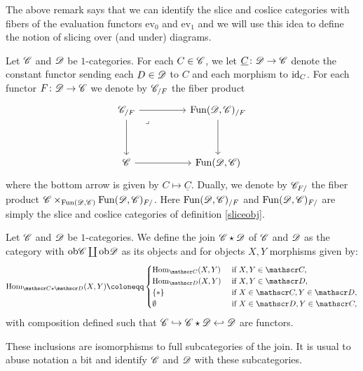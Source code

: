 \documentclass[../../thesis.tex]{subfiles}
\begin{document}
The above remark says that we can identify the slice and coslice categories with fibers of the evaluation functors $\mathrm{ev}_0$ and $\mathrm{ev}_1$ and we will use this idea to define the notion of slicing over (and under) diagrams.
\begin{definition}\label{slicefun}
    Let $\mathscr{C}$ and $\mathscr{D}$ be $1$-categories.
    For each $C\in \mathscr{C}$, we let $\underline{C} \colon \mathscr{D} \to \mathscr{C}$ denote the constant functor sending each $D\in \mathscr{D}$ to $C$ and each morphism to $\operatorname{id}_C$.
    For each functor $F\colon\mathscr{D}\to\mathscr{C}$ we denote by $\mathscr{C}_{/F}$ the fiber product
    \[\begin{tikzcd}
            {\C_{/F}} && {\Fun(\D,\C)_{/F}} \\
            \\
            \C && {\Fun(\D,\C)}
            \arrow[from=1-1, to=1-3]
            \arrow[from=1-1, to=3-1]
            \arrow[from=3-1, to=3-3]
            \arrow[from=1-3, to=3-3]
            \arrow["\lrcorner"{anchor=center, pos=0.125}, draw=none, from=1-1, to=3-3]
        \end{tikzcd}\]
    where the bottom arrow is given by $C \mapsto \underline{C}$.
    Dually, we denote by $\mathscr{C}_{F/}$ the fiber product ${\mathscr{C} \times_{\mathrm{Fun}(\mathscr{D},\mathscr{C})}\mathrm{Fun}(\mathscr{D},\mathscr{C})_{F/}}$.
    Here $\mathrm{Fun}(\mathscr{D},\mathscr{C})_{/F}$ and $\mathrm{Fun}(\mathscr{D},\mathscr{C})_{F/}$ are simply the slice and coslice categories of definition \ref{sliceobj}.
\end{definition}
\begin{definition}
    Let $\mathscr{C}$ and $\mathscr{D}$ be $1$-categories.
    We define the join $\mathscr{C} \star \mathscr{D}$ of $\mathscr{C}$ and $\mathscr{D}$ as the category with $\mathrm{ob}\mathscr{C} \coprod \mathrm{ob}\mathscr{D}$ as its objects and for objects $X, Y$ morphisms given by:
    \[
        \Hom_{\C \star \D}(X,Y) \coloneqq
        \begin{cases}
            \Hom_{\C}(X,Y) & \text{ if } X,Y \in \C,         \\
            \Hom_{\D}(X,Y) & \text{ if } X,Y \in \D,         \\
            \{*\}          & \text{ if } X \in \C, Y \in \D, \\
            \emptyset      & \text{ if } X \in \D, Y\in \C,
        \end{cases}
    \]
    with composition defined such that $\mathscr{C} \hookrightarrow \mathscr{C} \star \mathscr{D} \hookleftarrow \mathscr{D}$ are functors.
\end{definition}
\begin{remark}
    These inclusions are isomorphisms to full subcategories of the join.
    It is usual to abuse notation a bit and identify $\mathscr{C}$ and $\mathscr{D}$ with these subcategories.
\end{remark}
\end{document}
